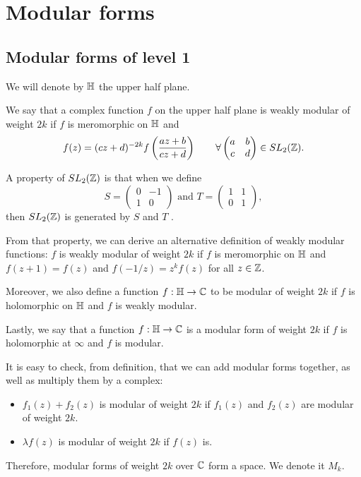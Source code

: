 \section{Modular forms}



\subsection{Modular forms of level 1}
We will denote by $\mathbb{H}$ the upper half plane.

We say that a complex function $f$ on the upper half plane is weakly modular of weight $2k$ if 
    $f$ is meromorphic on $\mathbb{H}$ and
    $$f(z) = (cz+d)^{-2k} f \left( \frac{az+b}{cz+d} \right) \qquad 
    \forall \begin{pmatrix} a&b\\c&d \end{pmatrix}\in SL_2(\mathbb{Z}).$$

A property of $SL_2(\mathbb{Z})$ is that when we define 
    $$S = \begin{pmatrix} 0&-1\\1&0 \end{pmatrix} \text{ and }
    T = \begin{pmatrix} 1&1\\0&1 \end{pmatrix},$$
then $SL_2(\mathbb{Z})$ is generated by $S$ and $T$ \cite[p.1-2]{SL2Z}.


From that property, we can derive an alternative definition of weakly modular functions:
$f$ is weakly modular of weight $2k$ if
    $f$ is meromorphic on $\mathbb{H}$ and
    $f(z+1) = f(z)$ and $f(-1/z) = z^k f(z)$
for all $z \in \mathbb{Z}$.

Moreover, we also define a function 
$f:\mathbb{H} \to \mathbb{C}$ to be modular of weight $2k$ if
    $f$ is holomorphic on $\mathbb{H}$ and
    $f$ is weakly modular.

Lastly, we say that a function 
$f:\mathbb{H} \to \mathbb{C}$ is a modular form of weight $2k$ if
    $f$ is holomorphic at $\infty$ and
    $f$ is modular.

It is easy to check, from definition, that we can add modular forms together, as well as multiply them by a complex:
\begin{itemize}
    \item $f_1(z)+f_2(z)$ is modular of weight $2k$ if $f_1(z)$ and $f_2(z)$ are modular of weight $2k$.
    \item $\lambda f(z)$ is modular of weight $2k$ if $f(z)$ is.
\end{itemize}
Therefore, modular forms of weight $2k$ over $\mathbb{C}$ form a space. We denote it $M_k$.

